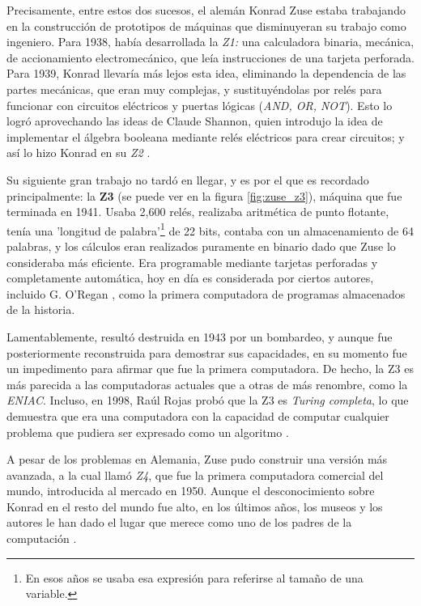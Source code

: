 \documentclass[letterpaper,12pt,oneside]{book}
\begin{document}
		
		Precisamente, entre estos dos sucesos, el alemán Konrad
		Zuse estaba trabajando en la construcción de prototipos de máquinas que disminuyeran su trabajo como ingeniero. Para 1938, había desarrollada la \textit{Z1:}
		una calculadora binaria, mecánica, de accionamiento electromecánico, que leía instrucciones de una tarjeta perforada. Para 1939, Konrad llevaría más lejos esta idea,
		eliminando la dependencia de las partes mecánicas, que eran muy complejas, y sustituyéndolas por relés para funcionar con circuitos eléctricos y
		puertas lógicas (\textit{AND, OR, NOT}). Esto lo logró aprovechando las ideas de Claude Shannon, quien introdujo la idea de implementar
		el álgebra booleana mediante relés eléctricos para crear circuitos; y así lo hizo Konrad en su \textit{Z2} \cite[p.206]{ifrah_universal_2001}.
  
		Su siguiente gran trabajo no tardó en llegar, y es por el que es recordado principalmente: la \textbf{Z3} (se puede ver en la figura \ref{fig:zuse_z3}), máquina que fue terminada en 1941. Usaba 2,600 relés, realizaba aritmética de punto flotante, tenía una 'longitud de palabra'\footnote{En esos años se usaba esa expresión para referirse al tamaño de una variable.} de 22 bits, contaba con un almacenamiento de 64 palabras, y los cálculos eran realizados puramente en binario dado que Zuse lo consideraba más eficiente. Era programable mediante tarjetas
		perforadas y completamente automática, hoy en día es considerada por ciertos autores, incluido G. O'Regan \cite{oregan_brief_2012}, como la primera computadora de programas almacenados de la historia.
  
		
		Lamentablemente, resultó destruida en 1943 por un bombardeo, y aunque fue posteriormente reconstruida para demostrar sus capacidades, en su momento fue un impedimento para afirmar que fue la primera computadora. De hecho, la Z3 es más parecida a las computadoras actuales que a otras de más renombre, como
		la \textit{ENIAC}. Incluso, en 1998, Raúl Rojas probó que la Z3 es \textit{Turing completa}, lo que demuestra que era
		una computadora con la capacidad de computar cualquier problema que pudiera ser expresado como un algoritmo 
		\cite{wikipedia_z3_2025,rojas_r_ieee_annals}.
  
        A pesar de los problemas en Alemania, Zuse pudo construir
		una versión más avanzada, a la cual llamó \textit{Z4}, que fue la primera computadora comercial del mundo, introducida al mercado en 1950. Aunque el desconocimiento
		sobre Konrad en el resto del mundo fue alto, en los últimos años, los museos y los autores le han dado el lugar que merece como uno de los padres de la computación \cite[p.206]{ifrah_universal_2001}.
		
\end{document}
